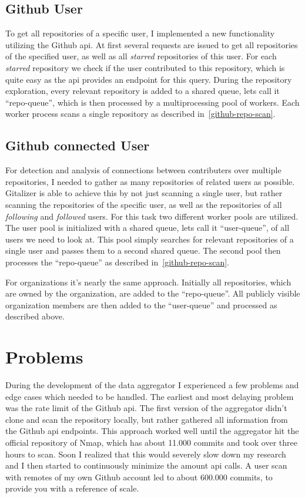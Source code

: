 \subsection{Github User}\label{github-user-scan}
To get all repositories of a specific user, I implemented a new functionality utilizing the Github \ac{api}.
At first several requests are issued to get all repositories of the specified user, as well as all \emph{starred} repositories of this user.
For each \emph{starred} repository we check if the user contributed to this repository, which is quite easy as the \ac{api} provides an endpoint for this query.
During the repository exploration, every relevant repository is added to a shared queue, lets call it ``repo-queue'', which is then processed by a multiprocessing pool of workers.
Each worker process scans a single repository as described in~\ref{github-repo-scan}.


\subsection{Github connected User}\label{github-user-remote-scan}
For detection and analysis of connections between contributers over multiple repositories, I needed to gather as many repositories of related users as possible.
Gitalizer is able to achieve this by not just scanning a single user, but rather scanning the repositories of the specific user, as well as the repositories of all \emph{following} and \emph{followed} users.
For this task two different worker pools are utilized.
The user pool is initialized with a shared queue, lets call it ``user-queue'', of all users we need to look at.
This pool simply searches for relevant repositories of a single user and passes them to a second shared queue.
The second pool then processes the ``repo-queue'' as described in~\ref{github-repo-scan}.

For organizations it's nearly the same approach.
Initially all repositories, which are owned by the organization, are added to the ``repo-queue''.
All publicly visible organization members are then added to the ``user-queue'' and processed as described above.


\section{Problems}
During the development of the data aggregator I experienced a few problems and edge cases which needed to be handled.
The earliest and most delaying problem was the rate limit of the Github \ac{api}.
The first version of the aggregator didn't clone and scan the repository locally, but rather gathered all information from the Github \ac{api} endpoints.
This approach worked well until the aggregator hit the official repository of Nmap, which has about 11.000 commits and took over three hours to scan.
Soon I realized that this would severely slow down my research and I then started to continuously minimize the amount \ac{api} calls.
A user scan with remotes of my own Github account led to about 600.000 commits, to provide you with a reference of scale.

